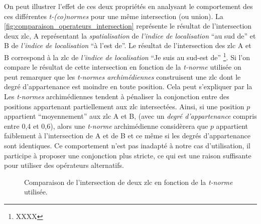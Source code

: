 On peut illustrer l'effet de ces deux propriétés en analysant le
comportement des ces différentes \emph{t-(co)normes} pour une même
intersection (ou union). La
\autoref{fig:comparaison_operateurs_intersection} représente le
résultat de l'intersection deux \ac{zlc},
\textcolor{RdBu-9-1}{\textsf{A}} représentant la \emph{spatialisation}
de \emph{l'indice de localisation} \enquote{au sud de} et
\textcolor{RdBu-9-9}{\textsf{B}} de \emph{l'indice de localisation}
\enquote{à l'est de}. Le résultat de l'intersection des \ac{zlc}
\textcolor{RdBu-9-1}{\textsf{A}} et \textcolor{RdBu-9-9}{\textsf{B}}
correspond à la \ac{zlc} de \emph{l'indice de localisation}
\enquote{Je suis au sud-est de} \footnote{XXXX}. Si l'on compare le
résultat de cette intersection en fonction de la \emph{t-norme}
utilisée on peut remarquer que les \emph{t-normes archimédiennes}
construisent une \ac{zlc} dont le degré d'appartenance est moindre en
toute position. Cela peut s'expliquer par la
%
Les \emph{t-normes} archimédiennes tendent à pénaliser la conjonction
entre des positions appartenant partiellement aux \ac{zlc}
intersectées. Ainsi, si une position \(p\) appartient
\enquote{moyennement} aux \ac{zlc} \textcolor{RdBu-9-1}{\textsf{A}} et
\textcolor{RdBu-9-9}{\textsf{B}}, (\eg avec un \emph{degré
  d’appartenance} compris entre 0,4 et 0,6), alors une \emph{t-norme}
archimédienne considèrera que \(p\) appartient faiblement à
l'intersection de \textcolor{RdBu-9-1}{\textsf{A}} et de
\textcolor{RdBu-9-9}{\textsf{B}} et ce même si les degrés
d'appartenance sont identiques.
%
Ce comportement n'est pas
inadapté à notre cas d'utilisation, il participe à proposer une
conjonction plus stricte, ce qui est une raison suffisante pour
utiliser des opérateurs alternatifs.

\begin{figure}
  \centering
  
  \caption{Comparaison de l'intersection de deux \ac{zlc} en fonction
    de la \emph{t-norme} utilisée.}
  \label{fig:comparaison_operateurs_intersection}
\end{figure}

